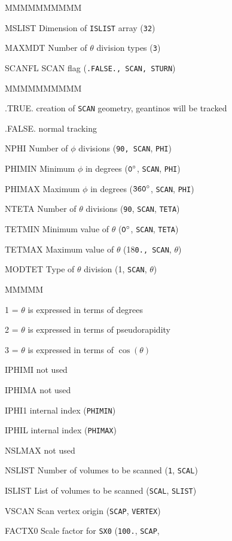 \begin{DLtt}{MMMMMMMMMM}
\item[MSLIST] Dimension of {\tt ISLIST} array ({\tt 32})
\item[MAXMDT] Number of $\theta$ division types ({\tt 3})
\item[SCANFL] SCAN flag ({\tt .FALSE., SCAN, STURN})
\begin{DLtt}{MMMMMMMMMM}
\item[.TRUE.]creation of {\tt SCAN} geometry, geantinos will be tracked
\item[.FALSE.]normal tracking
\end{DLtt}
\item[NPHI] Number of $\phi$ divisions ({\tt 90, SCAN}, {\tt PHI})
\item[PHIMIN] Minimum $\phi$ in degrees (${\tt 0^{\circ}}$,
{\tt SCAN}, {\tt PHI})
\item[PHIMAX] Maximum $\phi$ in degrees (${\tt 360^{\circ}}$,
{\tt SCAN}, {\tt PHI})
\item[NTETA] Number of $\theta$ divisions ({\tt 90}, {\tt SCAN},
{\tt TETA})
\item[TETMIN] Minimum value of $\theta$
(${\tt 0^{\circ}}$, {\tt SCAN}, {\tt TETA})
\item[TETMAX] Maximum value of $\theta$ (18{\tt 0.,  SCAN}, {\tt $\theta$})
\item[MODTET] Type of $\theta$ division (1, {\tt SCAN}, {\tt $\theta$})
\begin{DLtt}{MMMMM}
\item[1 =] $\theta$ is expressed in terms of degrees
\item[2 =] $\theta$ is expressed in terms of pseudorapidity
\item[3 =] $\theta$ is expressed in terms of $\cos(\theta)$
\end{DLtt}
\item[IPHIMI] not used
\item[IPHIMA] not used
\item[IPHI1] internal index ({\tt PHIMIN})
\item[IPHIL] internal index ({\tt PHIMAX})
\item[NSLMAX] not used
\item[NSLIST] Number of volumes to be scanned ({\tt 1}, {\tt SCAL})
\item[ISLIST] List of volumes to be scanned ({\tt SCAL}, {\tt SLIST})
\item[VSCAN] Scan vertex origin ({\tt SCAP}, {\tt VERTEX})
\item[FACTX0] Scale factor for {\tt SX0} ({\tt 100.}, {\tt SCAP},

\end{DLtt}
